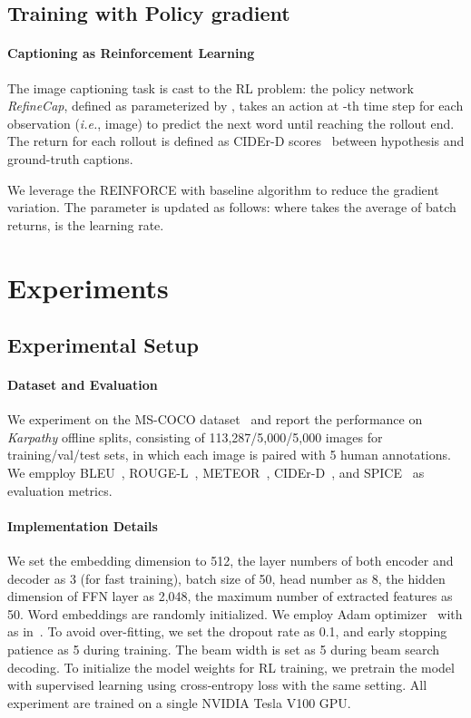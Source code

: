 \documentclass[11pt]{article}
\begin{document}
\subsection{Training with Policy gradient}
\label{subsec:train}

\paragraph{Captioning as Reinforcement Learning} The image captioning task is cast to the RL problem: the policy network \emph{RefineCap}, defined as  parameterized by , takes an action  at -th time step for each observation (\emph{i.e.}, image) to predict the next word  until reaching the rollout end. The return  for each rollout is defined as CIDEr-D scores~\cite{vedantam2015cider} between hypothesis and ground-truth captions.

We leverage the REINFORCE with baseline algorithm to reduce the gradient variation. The parameter  is updated as follows:
{where  takes the average of batch returns,  is the learning rate.}







\section{Experiments}
\label{sec:exp}
\subsection{Experimental Setup}
\paragraph{Dataset and Evaluation} We experiment on the MS-COCO dataset~\cite{lin2014microsoft} and report the performance on \textit{Karpathy} offline splits, consisting of 113,287/5,000/5,000 images for training/val/test sets, in which each image is paired with 5 human annotations. We empploy BLEU~\cite{papineni2002bleu}, ROUGE-L~\cite{Lin2004ROUGEAP}, METEOR~\cite{denkowski2014meteor}, CIDEr-D~\cite{vedantam2015cider}, and SPICE~\cite{anderson2016spice} as evaluation metrics.

\paragraph{Implementation Details} 
We set the embedding dimension  to 512, the layer numbers of both encoder and decoder as 3 (for fast training), batch size of 50, head number  as 8, the hidden dimension of FFN layer as 2,048, the maximum number of extracted features as 50. Word embeddings are randomly initialized. We employ Adam optimizer~\cite{kingma2014adam} with  as in~\cite{li2019entangled}. To avoid over-fitting, we set the dropout rate as 0.1, and early stopping patience as 5 during training. The beam width is set as 5 during beam search decoding. To initialize the model weights for RL training, we pretrain the model with supervised learning using cross-entropy loss with the same setting. All experiment are trained on a single NVIDIA Tesla V100 GPU.
\end{document}
